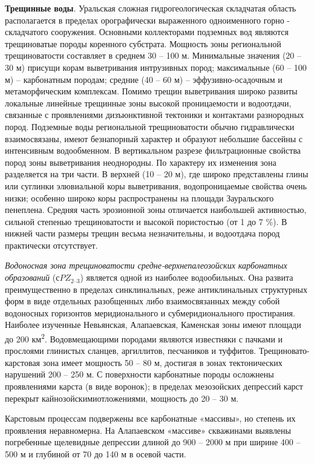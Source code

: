 \textbf{Трещинные воды}. Уральская сложная гидрогеологическая складчатая область располагается в пределах орографически выраженного одноименного горно - складчатого сооружения. Основными коллекторами подземных вод являются трещиноватые породы коренного субстрата. Мощность зоны региональной трещиноватости составляет в среднем 30 – 100 м. Минимальные значения (20 – 30 м) присущи корам выветривания интрузивных пород; максимальные (60 – 100 м) – карбонатным породам; средние (40 – 60 м) – эффузивно-осадочным и метаморфическим комплексам. Помимо трещин выветривания широко развиты локальные линейные трещинные зоны высокой проницаемости и водоотдачи, связанные с проявлениями дизъюнктивной тектоники и контактами разнородных пород. Подземные воды региональной трещиноватости обычно гидравлически взаимосвязаны, имеют безнапорный характер и образуют небольшие бассейны с интенсивным
водообменном. В вертикальном разрезе фильтрационные свойства пород зоны выветривания неоднородны. По характеру их изменения зона разделяется на три части. В верхней (10 – 20 м), где широко представлены глины или суглинки элювиальной коры выветривания, водопроницаемые свойства очень низки; особенно широко коры распространены на площади Зауральского пенеплена. Средняя часть эрозионной зоны отличается наибольшей активностью, сильной степенью трещиноватости и высокой пористостью (от 1 до 7 \%). В нижней части размеры трещин весьма незначительны, и водоотдача пород практически отсутствует.

\textit{Водоносная зона трещиноватости средне-верхнепалеозойских карбонатных образований} ($сPZ_{2–3}$) является одной из наиболее водообильных. Она развита преимущественно в пределах синклинальных, реже антиклинальных структурных форм в виде отдельных разобщенных либо взаимосвязанных между собой водоносных горизонтов меридионального и субмеридионального простирания. Наиболее изученные Невьянская, Алапаевская,
Каменская зоны имеют площади до 200 км\textsuperscript{2}. Водовмещающими породами являются известняки с пачками и прослоями глинистых сланцев, аргиллитов, песчаников и туффитов. Трещиновато-карстовая зона имеет мощность 50 – 80 м, достигая в зонах тектонических нарушений 200 – 250 м. С поверхности карбонатные породы осложнены проявлениями карста (в виде воронок); в пределах мезозойских депрессий карст перекрыт кайнозойскимиотложениями, мощность до 20 – 30 м.

Карстовым процессам подвержены все карбонатные «массивы», но степень их проявления неравномерна. На Алапаевском «массиве» скважинами выявлены погребенные щелевидные депрессии длиной до 900 – 2000 м
при ширине 400 – 500 м и глубиной от 70 до 140 м в осевой части.

